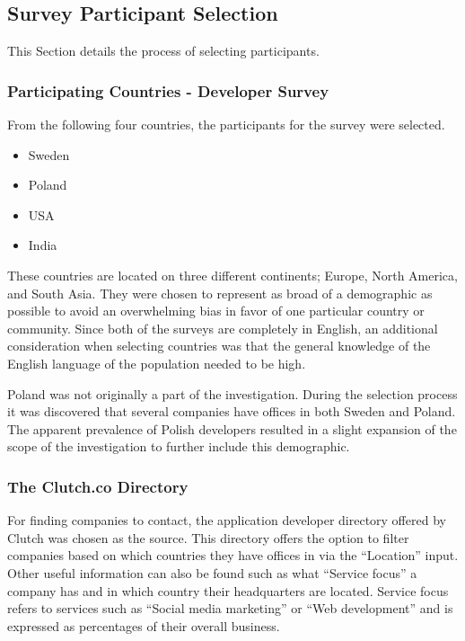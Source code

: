 \documentclass[a4paper,12pt]{article}
\begin{document}
\newpage
\subsection{Survey Participant Selection}
\label{Project_participantSelection}
This Section details the process of selecting participants.

\subsubsection{Participating Countries - Developer Survey}
\label{Project_participantSelection_countries}
From the following four countries, the participants for the survey were selected.
\begin{itemize}
    \item Sweden
    \item Poland
    \item USA
    \item India
\end{itemize}

These countries are located on three different continents; Europe, North America, and South Asia. They were chosen to represent as broad of a demographic as possible to avoid an overwhelming bias in favor of one particular country or community. Since both of the surveys are completely in English, an additional consideration when selecting countries was that the general knowledge of the English language of the population needed to be high.

Poland was not originally a part of the investigation. During the selection process it was discovered that several companies have offices in both Sweden and Poland. The apparent prevalence of Polish developers resulted in a slight expansion of the scope of the investigation to further include this demographic.

\subsubsection{The Clutch.co Directory}
\label{Project_participantSelection_clutch}
For finding companies to contact, the application developer directory offered by Clutch \cite{clutch} was chosen as the source. This directory offers the option to filter companies based on which countries they have offices in via the “Location” input. Other useful information can also be found such as what “Service focus” a company has and in which country their headquarters are located. Service focus refers to services such as “Social media marketing” or “Web development” and is expressed as percentages of their overall business.
\end{document}
